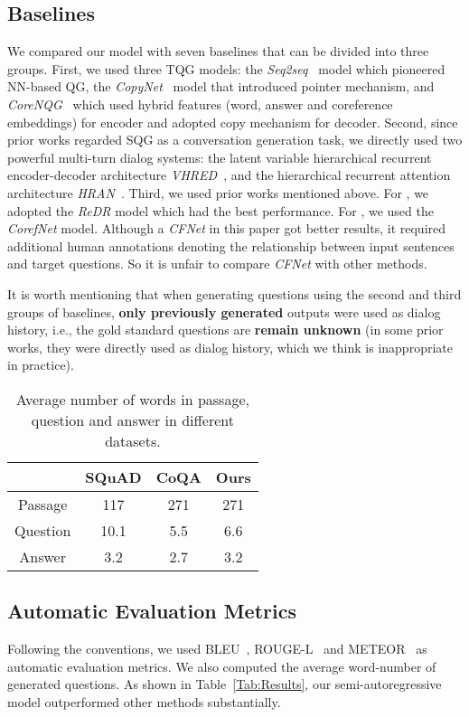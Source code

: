 \documentclass[11pt,a4paper]{article}
\begin{document}
\subsection{Baselines}
We compared our model with seven baselines that can be divided into three groups. First, we used three TQG models: the \textit{Seq2seq~\cite{du2017learning}} model which pioneered NN-based QG, the \textit{CopyNet~\cite{see2017get}} model that introduced pointer mechanism, and \textit{CoreNQG~\cite{du2018harvesting}} which used hybrid features (word, answer and coreference embeddings) for encoder and adopted copy mechanism for decoder.
Second, since prior works regarded SQG as a conversation generation task, we directly used two powerful multi-turn dialog systems: the latent variable hierarchical recurrent encoder-decoder architecture \textit{VHRED~\cite{serban2017hierarchical}}, and the hierarchical recurrent attention architecture \textit{HRAN~\cite{xing2018hierarchical}}. 
Third, we used prior works mentioned above. For \citet{pan2019reinforced}, we adopted the \textit{ReDR} model which had the best performance. For \citet{gao2019interconnected}, we used the \textit{CorefNet} model. Although a \textit{CFNet} in this paper got better results, it required additional human annotations denoting the relationship between input sentences and target questions. So it is unfair to compare \textit{CFNet} with other methods. 

It is worth mentioning that when generating questions using the second and third groups of baselines, \textbf{only previously generated} outputs were used as dialog history, i.e., the gold standard questions are \textbf{remain unknown} (in some prior works, they were directly used as dialog history, which we think is inappropriate in practice).

\begin{table}[t!]
	\centering
	\begin{tabular}{cccc}
		\hline
		& SQuAD & CoQA & Ours \\ \hline
		Passage  & 117   & 271  & 271  \\
		Question & 10.1  & 5.5  & 6.6  \\
		Answer   & 3.2   & 2.7  & 3.2  \\ \hline
	\end{tabular}
	\caption{Average number of words in passage, question and answer in different datasets.}
	\label{Tab:Length}
\end{table}


\subsection{Automatic Evaluation Metrics}
Following the conventions, we used BLEU~\cite{papineni2002bleu}, ROUGE-L~\cite{lin2004rouge} and METEOR~\cite{lavie2007meteor} as automatic evaluation metrics. We also computed the average word-number of generated questions. As shown in Table~\ref{Tab:Results}, our semi-autoregressive model outperformed other methods substantially.
\end{document}
